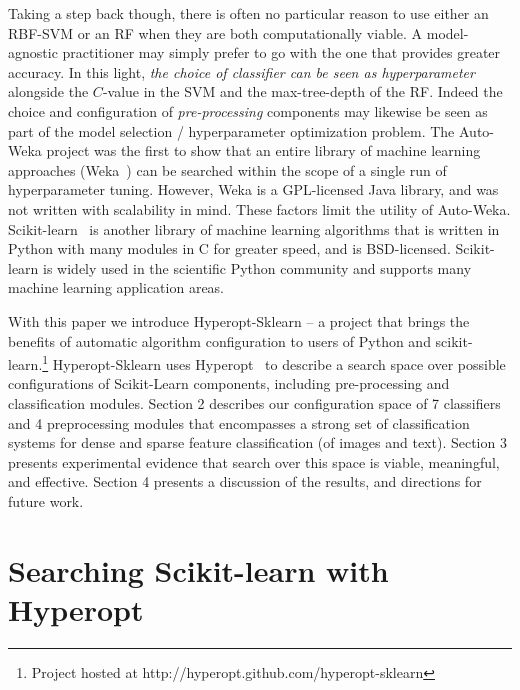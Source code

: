 \documentclass[wcp]{jmlr}
\begin{document}
Taking a step back though, there is often no particular reason to use either an RBF-SVM or an RF when they are both computationally viable.
A model-agnostic practitioner may simply prefer to go with the one that provides greater accuracy.
In this light, {\em the choice of classifier can be seen as hyperparameter} alongside the $C$-value in the SVM and the max-tree-depth of the RF.
Indeed the choice and configuration of {\em pre-processing} components may likewise be seen as part of the model selection / hyperparameter optimization problem.
The Auto-Weka project \citep{thornton+hutter+hoos+leyton-brown:2013} was the first to show that an entire library of machine learning approaches (Weka~\citep{hall2009weka}) can be searched within the scope of a single run of hyperparameter tuning.
However, Weka is a GPL-licensed Java library, and was not written with scalability in mind. These factors limit the utility of Auto-Weka.
Scikit-learn~\citep{sklearn} is another library of machine learning algorithms that is written in Python with many modules in C for greater speed, and is BSD-licensed.
Scikit-learn is widely used in the scientific Python community and supports many machine learning application areas.

With this paper we introduce Hyperopt-Sklearn -- a project that brings the benefits of automatic algorithm configuration to users of Python and scikit-learn.\footnote{Project hosted at http://hyperopt.github.com/hyperopt-sklearn}
Hyperopt-Sklearn uses Hyperopt~\citep{hyperopt} to describe a search space over possible configurations of Scikit-Learn components, including pre-processing and classification modules.
Section 2 describes our configuration space of 7 classifiers and 4 preprocessing modules that encompasses a strong set of classification systems for dense and sparse feature classification (of images and text).
Section 3 presents experimental evidence that search over this space is viable, meaningful, and effective.
Section 4 presents a discussion of the results, and directions for future work.


\section{Searching Scikit-learn with Hyperopt}
\end{document}
